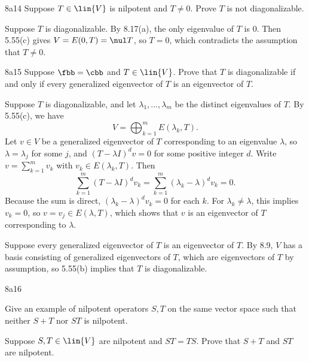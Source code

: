 \begin{exercise}{8a14}
    Suppose $T \in \lin{V}$ is nilpotent and $T \neq 0$.
    Prove $T$ is not diagonalizable.
\end{exercise}

\begin{sol}
    Suppose $T$ is diagonalizable.
    By 8.17(a), the only eigenvalue of $T$ is $0$.
    Then 5.55(c) gives $V = E(0, T) = \nul T$, so $T = 0$, which contradicts the assumption that $T \neq 0$.
\end{sol}

\begin{exercise}{8a15}
    Suppose $\fbb = \cbb$ and $T \in \lin{V}$.
    Prove that $T$ is diagonalizable if and only if every generalized eigenvector of $T$ is an eigenvector of $T$.

\end{exercise}

\begin{soliff}
    \rightimp Suppose $T$ is diagonalizable, and let $\lambda_1, \ldots, \lambda_m$ be the distinct eigenvalues of $T$.
    By 5.55(c), we have
    \[
        V = \bigoplus_{k=1}^m E(\lambda_k, T).
    \]
    Let $v \in V$ be a generalized eigenvector of $T$ corresponding to an eigenvalue $\lambda$, so $\lambda = \lambda_j$ for some $j$, and $(T - \lambda I)^d v = 0$ for some positive integer $d$.
    Write $v = \sum_{k=1}^m v_k$ with $v_k \in E(\lambda_k, T)$.
    Then
    \[
        \sum_{k=1}^m (T - \lambda I)^d v_k = \sum_{k=1}^m (\lambda_k - \lambda)^d v_k = 0.
    \]
    Because the sum is direct, $(\lambda_k - \lambda)^d v_k = 0$ for each $k$.
    For $\lambda_k \neq \lambda$, this implies $v_k = 0$, so $v = v_j \in E(\lambda, T)$, which shows that $v$ is an eigenvector of $T$ corresponding to $\lambda$.

    \leftimp Suppose every generalized eigenvector of $T$ is an eigenvector of $T$.
    By 8.9, $V$ has a basis consisting of generalized eigenvectors of $T$, which are eigenvectors of $T$ by assumption, so 5.55(b) implies that $T$ is diagonalizable.
\end{soliff}

\begin{exercise}{8a16}
    \begin{subexercises}
        \item Give an example of nilpotent operators $S, T$ on the same vector space such that neither $S + T$ nor $ST$ is nilpotent.
        \item Suppose $S, T \in \lin{V}$ are nilpotent and $ST = TS$.
        Prove that $S + T$ and $ST$ are nilpotent.
    \end{subexercises}
\end{exercise}

